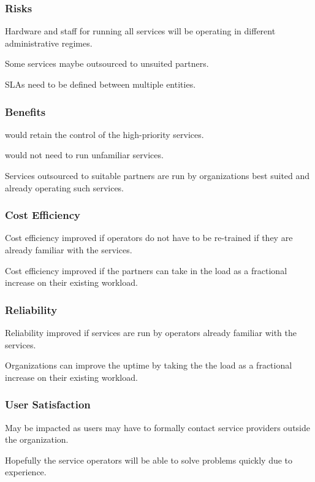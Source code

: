 \documentclass[12pt,a4paper]{article}
\begin{document}
\subsubsection*{Risks}
\bitm
  \item Hardware and staff for running all services will be operating in different administrative regimes.
   \item Some services maybe outsourced to unsuited partners.
   \item SLAs need to be defined between multiple entities.
\eitm

\subsubsection*{Benefits}
\bitm
  \item \EC would retain the control of the high-priority services.
  \item \EC would not need to run unfamiliar services.
  \item Services outsourced to suitable partners are run by organizations best suited and already operating such services.
\eitm

\subsubsection*{Cost Efficiency}
\bitm
  \item Cost efficiency improved if operators do not have to be re-trained if they are already familiar with the services.
  \item Cost efficiency improved if the partners can take in the \ED load as a fractional increase on their existing workload.
\eitm

\subsubsection*{Reliability}
\bitm
  \item Reliability improved if services are run by operators already familiar with the services.
  \item Organizations can improve the uptime by taking the the \ED load as a fractional increase on their existing workload.
\eitm

\subsubsection*{User Satisfaction}
\bitm
  \item May be impacted as users may have to formally contact service providers outside the \EC organization.
  \item Hopefully the service operators will be able to solve problems quickly due to experience.
\eitm
\end{document}
